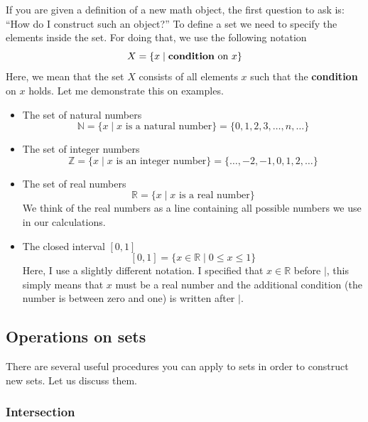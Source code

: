If you are given a definition of a new math object, the first question to ask is: ``How do I construct such an object?'' To define a set we need to specify the elements inside the set.
For doing that, we use the following notation
\[
X = \{x\mid \text{\textbf{condition} on }x\}
\]
Here, we mean that the set $X$ consists of all elements $x$ such that the \textbf{condition} on $x$ holds.
Let me demonstrate this on examples.
\begin{itemize}
\item The set of natural numbers
\[
\mathbb N = \{x\mid x \text{ is a natural number}\} = \{0, 1, 2, 3, \ldots, n,\ldots\}
\]

\item The set of integer numbers
\[
\mathbb Z = \{x\mid x \text{ is an integer number}\} = \{\ldots,-2,-1,0,1,2,\ldots\}
\]

\item The set of real numbers
\[
\mathbb R = \{x\mid x \text{ is a real number}\}
\]
We think of the real numbers as a line containing all possible numbers we use in our calculations.

\item The closed interval $[0, 1]$
\[
[0, 1] = \{x\in \mathbb R \mid 0\leqslant x \leqslant 1\}
\]
Here, I use a slightly different notation.
I specified that $x\in \mathbb R$ before $|$, this simply means that $x$ must be a real number and the additional condition (the number is between zero and one) is written after $|$.

\end{itemize}


\subsection{Operations on sets}

There are several useful procedures you can apply to sets in order to construct new sets.
Let us discuss them.

\subsubsection{Intersection}

